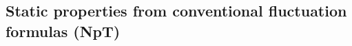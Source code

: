 \subsection{Static properties from conventional fluctuation formulas (NpT)}
\label{sec:PropConv}





